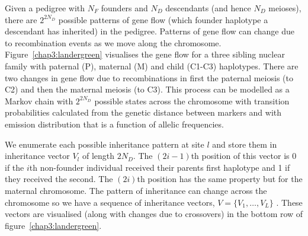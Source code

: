 Given a pedigree with $N_F$ founders and $N_D$ descendants (and hence $N_D$ meioses), there are $2^{2N_D}$ possible patterns of gene flow (which founder haplotype a descendant has inherited) in the pedigree.  Patterns of gene flow can change due to recombination events as we move along the chromosome. Figure~\ref{chap3:landergreen} visualises the gene flow for a three sibling nuclear family with paternal (P), maternal (M) and child (C1-C3) haplotypes. There are two changes in gene flow due to recombinations in first the paternal meiosis (to C2) and then the maternal meiosis (to C3). This process can be modelled as a Markov chain with $2^{2N_D}$ possible states across the chromosome with transition probabilities calculated from the genetic distance between markers and with emission distribution that is a function of allelic frequencies.  

We enumerate each possible inheritance pattern at site $l$ and store them in inheritance vector $V_l$ of length $2N_D$. The $(2i-1)$th position of this vector is 0 if the $i$th non-founder individual received their parents first haplotype and 1 if they received the second.  The $(2i)$th position has the same property but for the maternal chromosome.  The pattern of inheritance can change across the chromosome so we have a sequence of inheritance vectors, $V=\{V_1,\ldots,V_L\}$ .  These vectors are visualised (along with changes due to crossovers) in the bottom row of figure~\ref{chap3:landergreen}.

